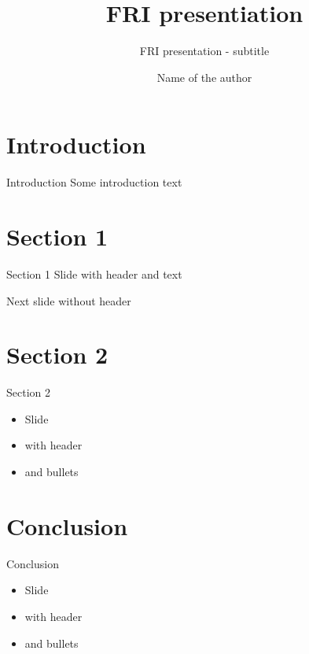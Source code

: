 \documentclass{beamer}
\author{Name of the author}
\title{FRI presentiation}
\subtitle{FRI presentation - subtitle}
\begin{document}
\frontcover

\frame{\titlepage}

\frame{\tableofcontents}

\section{Introduction}

\begin{frame}{Introduction}
Some introduction text
\end{frame}

\section{Section 1}
\frame{\sectionpage}

\begin{frame}{Section 1}
Slide with header and text
\end{frame}

\begin{frame}
Next slide without header
\end{frame}

\section{Section 2}
\frame{\sectionpage}

\begin{frame}{Section 2}
	\begin{itemize}
		\item Slide 
		\item with header
		\item and bullets
	\end{itemize}
\end{frame}

\section{Conclusion}

\begin{frame}{Conclusion}
	\begin{itemize}
		\item Slide 
		\item with header
		\item and bullets
	\end{itemize}
\end{frame}

\backcover
\end{document}
